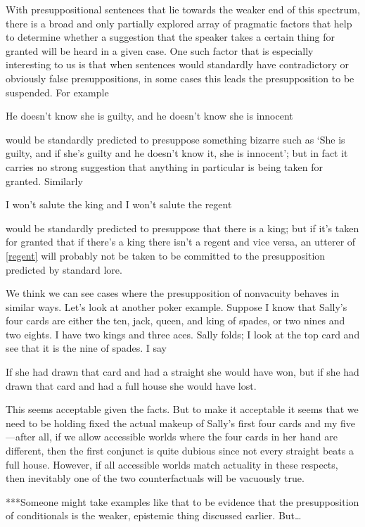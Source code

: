 \documentclass[If.tex]{subfiles}
\begin{document}
\begin{prop}
With presuppositional sentences that lie towards the weaker end of this spectrum, there is a broad and only partially explored array of pragmatic factors that help to determine whether a suggestion that the speaker takes a certain thing for granted will be heard in a given case. One such factor that is especially interesting to us is that when sentences would standardly have contradictory or obviously false presuppositions, in some cases this leads the presupposition to be suspended. For example
\begin{prop}
	\nitem 
		He doesn't know she is guilty, and he doesn't know she is innocent
\end{prop}
would be standardly predicted to presuppose something bizarre such as ‘She is guilty, and if she's guilty and he doesn't know it, she is innocent’; but in fact it carries no strong suggestion that anything in particular is being taken for granted. Similarly
\begin{prop}
	\nitem \label{regent}
		I won't salute the king and I won't salute the regent
\end{prop}
would be standardly predicted to presuppose that there is a king; but if it's taken for granted that if there's a king there isn't a regent and vice versa, an utterer of \ref{regent} will probably not be taken to be committed to the presupposition predicted by standard lore.

We think we can see cases where the presupposition of nonvacuity behaves in similar ways. Let's look at another poker example. Suppose I know that Sally's four cards are either the ten, jack, queen, and king of spades, or two nines and two eights. I have two kings and three aces. Sally folds; I look at the top card and see that it is the nine of spades. I say
\begin{prop}
	\nitem \label{cards}
		If she had drawn that card and had a straight she would have won, but if she had drawn that card and had a full house she would have lost.
\end{prop}
This seems acceptable given the facts. But to make it acceptable it seems that we need to be holding fixed the actual makeup of Sally's first four cards and my five---after all, if we allow accessible worlds where the four cards in her hand are different, then the first conjunct is quite dubious since not every straight beats a full house. However, if all accessible worlds match actuality in these respects, then inevitably one of the two counterfactuals will be vacuously true.

***Someone might take examples like that to be evidence that the presupposition of conditionals is the weaker, epistemic thing discussed earlier.  But…


\end{prop}
\end{document}
